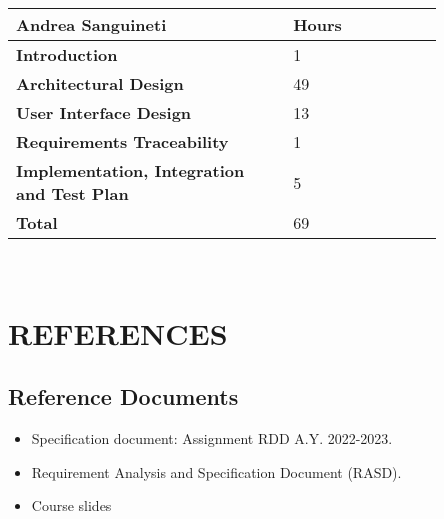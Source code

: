 \begin{table}[H]
\centering 
    \begin{tabular}{| p{0.55\linewidth} | p{0.30\linewidth} |}
    \hline
    \rowcolor{bluepoli!40}
    \textbf{Andrea Sanguineti} & \textbf{Hours}\T\B \\     
    \hline \hline
    \textbf{Introduction} & 1 \T\B \\
    \hline 
    \textbf{Architectural Design} & 49 \T\B \\
    \hline 
    \textbf{User Interface Design} & 13 \T\B \\
    \hline 
    \textbf{Requirements Traceability} & 1 \T\B \\
    \hline
    \textbf{Implementation, Integration and Test Plan} & 5 \T\B \\
    \hline 
    \textbf{Total} & 69 \T\B \\
    \hline 
    \end{tabular}
    \\[10pt]
\end{table}


\chapter{REFERENCES}
\label{ch:references}%
\section{Reference Documents}
\begin{itemize}
  \item Specification document: Assignment RDD A.Y. 2022-2023.
  \item Requirement Analysis and Specification Document (RASD).
  \item Course slides
\end{itemize}

